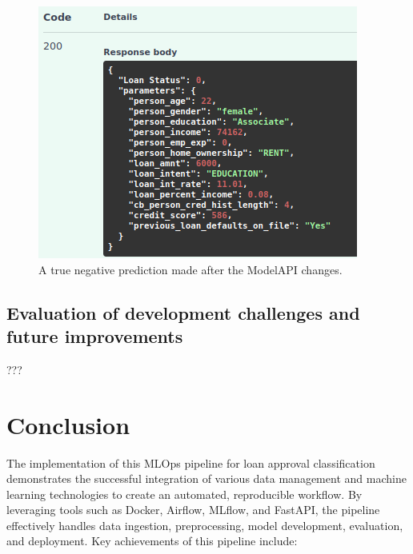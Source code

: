 \documentclass[12pt]{report}
\begin{document}
\begin{figure}[H]
    \centering
    \includegraphics[width=.75\linewidth]{Implementation/JAN 10 UPDATES/NewTrueNegativeOutput.png}
    \caption{A true negative prediction made after the ModelAPI changes.}
    \label{fig:TrueNegativeNew}
\end{figure}

\section{Evaluation of development challenges and future improvements}
???

\chapter*{Conclusion}
The implementation of this MLOps pipeline for loan approval classification demonstrates the successful integration of various
data management and machine learning technologies to create an automated, reproducible workflow. By leveraging tools such as Docker,
Airflow, MLflow, and FastAPI, the pipeline effectively handles data ingestion, preprocessing, model development, evaluation, and 
deployment. Key achievements of this pipeline include:
\end{document}
